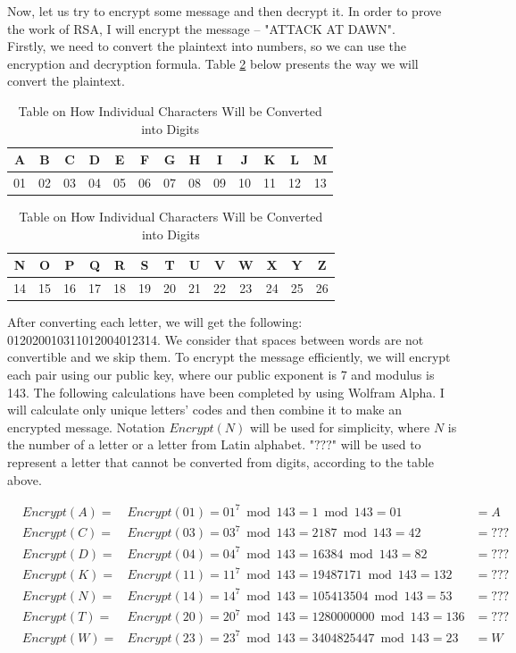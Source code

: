 \documentclass[a4paper, 12pt]{article}
\begin{document}
Now, let us try to encrypt some message and then decrypt it. In order to prove the work of RSA, I
will encrypt the message – "ATTACK AT DAWN".\\

Firstly, we need to convert the plaintext into numbers, so we can use the encryption and decryption
formula. Table \ref{table:simple} below presents the way we will convert the plaintext.

\begin{table}[t!]
  \begin{center}
    \begin{tabular}{c|c|c|c|c|c|c|c|c|c|c|c|c}
      A& B& C& D& E& F& G& H& I& J& K& L& M\\
      \hline
      01& 02& 03& 04& 05& 06& 07& 08& 09& 10& 11& 12& 13\\
    \end{tabular}
    \begin{tabular}{c|c|c|c|c|c|c|c|c|c|c|c|c}
      N& O& P& Q& R& S& T& U& V& W& X& Y& Z\\
      \hline
      14& 15& 16& 17& 18& 19& 20& 21& 22& 23& 24& 25& 26\\
    \end{tabular}
    \caption{Table on How Individual Characters Will be Converted into Digits}
    \label{table:simple}
  \end{center}
  \end{table}

After converting each letter, we will get the following: 012020010311012004012314. We
consider that spaces between words are not convertible and we skip them. To encrypt the message
efficiently, we will encrypt each pair using our public key, where our public exponent is 7 and
modulus is 143. The following calculations have been completed by using Wolfram Alpha. I will
calculate only unique letters’ codes and then combine it to make an encrypted message. Notation
$Encrypt(N)$ will be used for simplicity, where $N$ is the number of a letter or a letter from Latin alphabet.
"$???$" will be used to represent a letter that cannot be converted from digits, according to the table above.

\begin{align*}
  &Encrypt(A)=&Encrypt(01)=01^7 \bmod 143=1 \bmod 143=01&=A\\
  &Encrypt(C)=&Encrypt(03)=03^7 \bmod 143=2187 \bmod 143=42&=???\\
  &Encrypt(D)=&Encrypt(04)=04^7 \bmod 143=16384 \bmod 143=82&=???\\
  &Encrypt(K)=&Encrypt(11)=11^7 \bmod 143=19487171 \bmod 143=132&=???\\
  &Encrypt(N)=&Encrypt(14)=14^7 \bmod 143=105413504 \bmod 143=53&=???\\
  &Encrypt(T)=&Encrypt(20)=20^7 \bmod 143=1280000000 \bmod 143=136&=???\\
  &Encrypt(W)=&Encrypt(23)=23^7 \bmod 143=3404825447 \bmod 143=23&=W\\
\end{align*}
\end{document}
